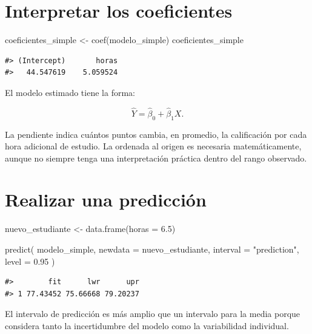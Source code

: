 \documentclass[
  spanish,
  10.5pt,
  letterpaper,
  openany,
  headings=big]{scrbook}
\newenvironment{Shaded}{}{}
\newcommand{\AttributeTok}[1]{\textcolor[rgb]{0.84,0.23,0.29}{#1}}
\newcommand{\FloatTok}[1]{\textcolor[rgb]{0.00,0.36,0.77}{#1}}
\newcommand{\FunctionTok}[1]{\textcolor[rgb]{0.44,0.26,0.76}{#1}}
\newcommand{\NormalTok}[1]{\textcolor[rgb]{0.14,0.16,0.18}{#1}}
\newcommand{\OtherTok}[1]{\textcolor[rgb]{0.44,0.26,0.76}{#1}}
\newcommand{\StringTok}[1]{\textcolor[rgb]{0.01,0.18,0.38}{#1}}
\begin{document}
\section{Interpretar los
coeficientes}\label{interpretar-los-coeficientes}

\begin{Shaded}
\begin{Highlighting}[]
\NormalTok{coeficientes\_simple }\OtherTok{\textless{}{-}} \FunctionTok{coef}\NormalTok{(modelo\_simple)}
\NormalTok{coeficientes\_simple}
\end{Highlighting}
\end{Shaded}

\begin{verbatim}
#> (Intercept)       horas 
#>   44.547619    5.059524
\end{verbatim}

El modelo estimado tiene la forma:

\[
\widehat{Y} = \widehat{\beta}_0 + \widehat{\beta}_1 X.
\]

La pendiente indica cuántos puntos cambia, en promedio, la calificación
por cada hora adicional de estudio. La ordenada al origen es necesaria
matemáticamente, aunque no siempre tenga una interpretación práctica
dentro del rango observado.

\section{Realizar una predicción}\label{realizar-una-predicciuxf3n}

\begin{Shaded}
\begin{Highlighting}[]
\NormalTok{nuevo\_estudiante }\OtherTok{\textless{}{-}} \FunctionTok{data.frame}\NormalTok{(}\AttributeTok{horas =} \FloatTok{6.5}\NormalTok{)}

\FunctionTok{predict}\NormalTok{(}
\NormalTok{  modelo\_simple,}
  \AttributeTok{newdata =}\NormalTok{ nuevo\_estudiante,}
  \AttributeTok{interval =} \StringTok{"prediction"}\NormalTok{,}
  \AttributeTok{level =} \FloatTok{0.95}
\NormalTok{)}
\end{Highlighting}
\end{Shaded}

\begin{verbatim}
#>        fit      lwr      upr
#> 1 77.43452 75.66668 79.20237
\end{verbatim}

El intervalo de predicción es más amplio que un intervalo para la media
porque considera tanto la incertidumbre del modelo como la variabilidad
individual.
\end{document}
